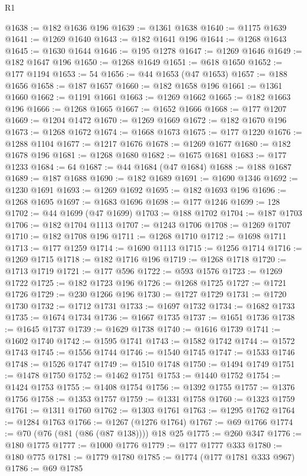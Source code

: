 \begin{lexlean}{R1}
\begin{coremodule}
@1638 := @182 @1636 @196
@1639 := @1361 @1638
@1640 := @1175 @1639
@1641 := @1269 @1640
@1643 := @182 @1641 @196
@1644 := @1268 @1643
@1645 := @1630 @1644
@1646 := @195 @1278
@1647 := @1269 @1646
@1649 := @182 @1647 @196
@1650 := @1268 @1649
@1651 := @618 @1650
@1652 := @177 @1194
@1653 := 54
@1656 := @44 @1653 (@47 @1653)
@1657 := @188 @1656
@1658 := @187 @1657
@1660 := @182 @1658 @196
@1661 := @1361 @1660
@1662 := @1191 @1661
@1663 := @1269 @1662
@1665 := @182 @1663 @196
@1666 := @1268 @1665
@1667 := @1652 @1666
@1668 := @177 @1207
@1669 := @1204 @1472
@1670 := @1269 @1669
@1672 := @182 @1670 @196
@1673 := @1268 @1672
@1674 := @1668 @1673
@1675 := @177 @1220
@1676 := @1288 @1104
@1677 := @1217 @1676
@1678 := @1269 @1677
@1680 := @182 @1678 @196
@1681 := @1268 @1680
@1682 := @1675 @1681
@1683 := @177 @1233
@1684 := 64
@1687 := @44 @1684 (@47 @1684)
@1688 := @188 @1687
@1689 := @187 @1688
@1690 := @182 @1689
@1691 := @1690 @1346
@1692 := @1230 @1691
@1693 := @1269 @1692
@1695 := @182 @1693 @196
@1696 := @1268 @1695
@1697 := @1683 @1696
@1698 := @177 @1246
@1699 := 128
@1702 := @44 @1699 (@47 @1699)
@1703 := @188 @1702
@1704 := @187 @1703
@1706 := @182 @1704 @1113
@1707 := @1243 @1706
@1708 := @1269 @1707
@1710 := @182 @1708 @196
@1711 := @1268 @1710
@1712 := @1698 @1711
@1713 := @177 @1259
@1714 := @1690 @1113
@1715 := @1256 @1714
@1716 := @1269 @1715
@1718 := @182 @1716 @196
@1719 := @1268 @1718
@1720 := @1713 @1719
@1721 := @177 @596
@1722 := @593 @1576
@1723 := @1269 @1722
@1725 := @182 @1723 @196
@1726 := @1268 @1725
@1727 := @1721 @1726
@1729 := @230 @1266 @196
@1730 := @1727 @1729
@1731 := @1720 @1730
@1732 := @1712 @1731
@1733 := @1697 @1732
@1734 := @1682 @1733
@1735 := @1674 @1734
@1736 := @1667 @1735
@1737 := @1651 @1736
@1738 := @1645 @1737
@1739 := @1629 @1738
@1740 := @1616 @1739
@1741 := @1602 @1740
@1742 := @1595 @1741
@1743 := @1582 @1742
@1744 := @1572 @1743
@1745 := @1556 @1744
@1746 := @1540 @1745
@1747 := @1533 @1746
@1748 := @1526 @1747
@1749 := @1510 @1748
@1750 := @1494 @1749
@1751 := @1478 @1750
@1752 := @1462 @1751
@1753 := @1440 @1752
@1754 := @1424 @1753
@1755 := @1408 @1754
@1756 := @1392 @1755
@1757 := @1376 @1756
@1758 := @1353 @1757
@1759 := @1331 @1758
@1760 := @1323 @1759
@1761 := @1311 @1760
@1762 := @1303 @1761
@1763 := @1295 @1762
@1764 := @1284 @1763
@1766 := @1267 (@1276 @1764)
@1767 := @69 @1766
@1774 := @70 (@76 (@81 (@86 (@87 @138)))) @18 @25
@1775 := @260 @347
@1776 := @180 @1775
@1777 := @1000 @1776
@1779 := @177 @1777 @333
@1780 := @180 @775
@1781 := @1779 @1780
@1785 := @1774 (@177 @1781 @333 @967)
@1786 := @69 @1785

\end{coremodule}
\end{lexlean}
